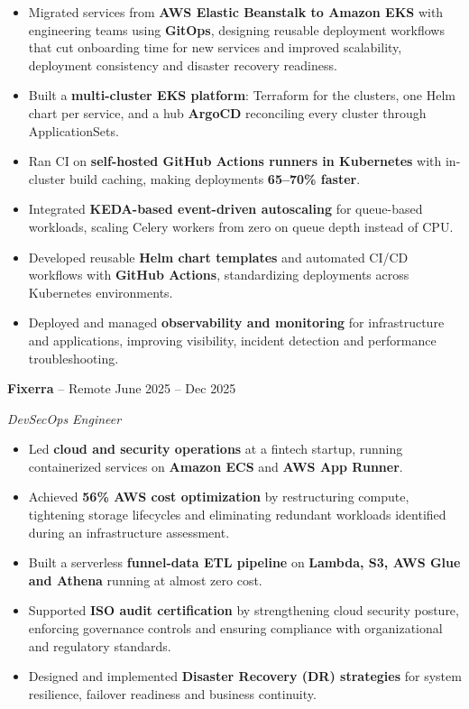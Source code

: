 \documentclass[11pt, a4paper]{article}
\begin{document}
\begin{itemize}[label=-]
    \item Migrated services from \textbf{AWS Elastic Beanstalk to Amazon EKS} with engineering teams using \textbf{GitOps}, designing reusable deployment workflows that cut onboarding time for new services and improved scalability, deployment consistency and disaster recovery readiness.

    \item Built a \textbf{multi-cluster EKS platform}: Terraform for the clusters, one Helm chart per service, and a hub \textbf{ArgoCD} reconciling every cluster through ApplicationSets.

    \item Ran CI on \textbf{self-hosted GitHub Actions runners in Kubernetes} with in-cluster build caching, making deployments \textbf{65--70\% faster}.

    \item Integrated \textbf{KEDA-based event-driven autoscaling} for queue-based workloads, scaling Celery workers from zero on queue depth instead of CPU.

    \item Developed reusable \textbf{Helm chart templates} and automated CI/CD workflows with \textbf{GitHub Actions}, standardizing deployments across Kubernetes environments.

    \item Deployed and managed \textbf{observability and monitoring} for infrastructure and applications, improving visibility, incident detection and performance troubleshooting.
\end{itemize}

\textbf{Fixerra} -- Remote \hfill June 2025 -- Dec 2025

\textit{DevSecOps Engineer}

\begin{itemize}[label=-]
    \item Led \textbf{cloud and security operations} at a fintech startup, running containerized services on \textbf{Amazon ECS} and \textbf{AWS App Runner}.

    \item Achieved \textbf{56\% AWS cost optimization} by restructuring compute, tightening storage lifecycles and eliminating redundant workloads identified during an infrastructure assessment.

    \item Built a serverless \textbf{funnel-data ETL pipeline} on \textbf{Lambda, S3, AWS Glue and Athena} running at almost zero cost.

    \item Supported \textbf{ISO audit certification} by strengthening cloud security posture, enforcing governance controls and ensuring compliance with organizational and regulatory standards.

    \item Designed and implemented \textbf{Disaster Recovery (DR) strategies} for system resilience, failover readiness and business continuity.
\end{itemize}
\end{document}
